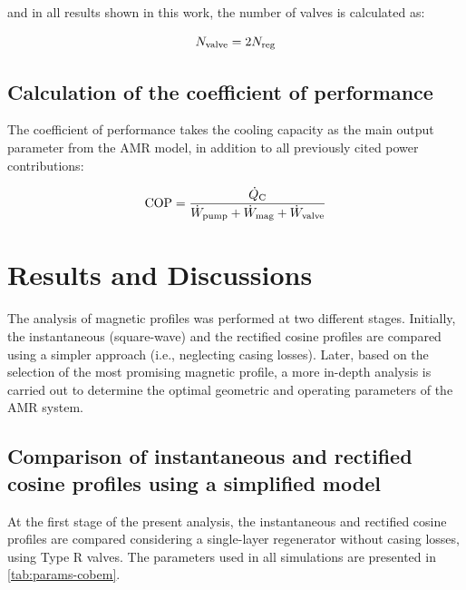 \documentclass[referee]{svjour3}
\begin{document}
\noindent and in all results shown in this work, the number of valves is calculated as:

\begin{equation}
  \label{eq:111}
  N_{\mathrm{valve}} = 2 N_{\mathrm{reg}}
\end{equation}

\subsection{Calculation of the coefficient of performance}
\label{sec:calc-coeff-perf}

The coefficient of performance takes the cooling capacity as the main output parameter from the AMR model, in addition to all previously cited power contributions:

\begin{equation}
  \label{eq:112}
  \mathrm{COP} = \frac{\dot{Q}_{\mathrm{C}}}{\dot{W}_{\mathrm{pump}} + \dot{W}_{\mathrm{mag}} + \dot{W}_{\mathrm{valve}}}
\end{equation}



\section{Results and Discussions}
\label{sec:results-discussions}

The analysis of magnetic profiles was performed at two different stages. Initially, the instantaneous (square-wave) and the rectified cosine profiles are compared using a simpler approach (i.e., neglecting casing losses). Later, based on the selection of the most promising magnetic profile, a more in-depth analysis is carried out to determine the optimal geometric and operating parameters of the AMR system.

\subsection{Comparison of instantaneous and rectified cosine profiles using a simplified model}
\label{sec:comp-cosine-inst}

At the first stage of the present analysis, the instantaneous and rectified cosine profiles are compared considering a single-layer regenerator  without casing losses, using Type R valves. The parameters used in all simulations are presented in \autoref{tab:params-cobem}.
\end{document}
